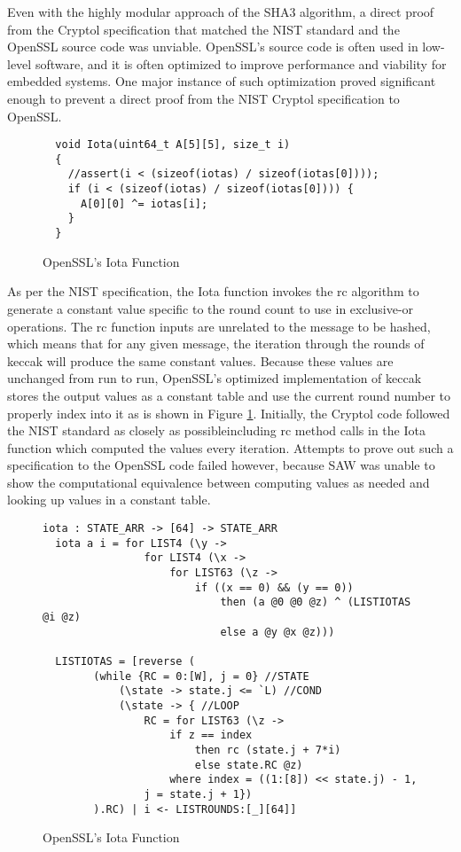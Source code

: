 Even with the highly modular approach of the SHA3 algorithm, a direct proof from the Cryptol specification that matched the NIST standard and the OpenSSL source code was unviable.
OpenSSL's source code is often used in low-level software, and it is often optimized to improve performance and viability for embedded systems.
One major instance of such optimization proved significant enough to prevent a direct proof from the NIST Cryptol specification to OpenSSL.

\lstset{style=customc, firstnumber=177}
\begin{figure}[h]
  \centering
\begin{lstlisting}
  void Iota(uint64_t A[5][5], size_t i)
  {
    //assert(i < (sizeof(iotas) / sizeof(iotas[0])));
    if (i < (sizeof(iotas) / sizeof(iotas[0]))) {
      A[0][0] ^= iotas[i];
    }
  }
\end{lstlisting}
\caption{OpenSSL's Iota Function}
\label{fig:cIota}
\end{figure}

As per the NIST specification, the Iota function invokes the rc algorithm to generate a constant value specific to the round count to use in exclusive-or operations.
The rc function inputs are unrelated to the message to be hashed, which means that for any given message, the iteration through the rounds of keccak will produce the same constant values.
Because these values are unchanged from run to run, OpenSSL's optimized implementation of keccak stores the output values as a constant table and use the current round number to properly index into it as is shown in Figure \ref{fig:cIota}. 
Initially, the Cryptol code followed the NIST standard as closely as possible\textemdash including rc method calls in the Iota function which computed the values every iteration.
Attempts to prove out such a specification to the OpenSSL code failed however, because SAW was unable to show the computational equivalence between computing values as needed and looking up values in a constant table.

\begin{figure}[h]
  \centering
\begin{lstlisting}[language=Cryptol]
  iota : STATE_ARR -> [64] -> STATE_ARR
  iota a i = for LIST4 (\y ->
                for LIST4 (\x ->
                    for LIST63 (\z ->
                        if ((x == 0) && (y == 0))
                            then (a @0 @0 @z) ^ (LISTIOTAS @i @z)
	                        else a @y @x @z)))

  LISTIOTAS = [reverse (
        (while {RC = 0:[W], j = 0} //STATE
            (\state -> state.j <= `L) //COND
            (\state -> { //LOOP
                RC = for LIST63 (\z ->
                    if z == index
                        then rc (state.j + 7*i)
                        else state.RC @z)
                    where index = ((1:[8]) << state.j) - 1,
                j = state.j + 1})
        ).RC) | i <- LISTROUNDS:[_][64]]
\end{lstlisting}
\caption{OpenSSL's Iota Function}
\label{fig:cryptolIota}
\end{figure}

